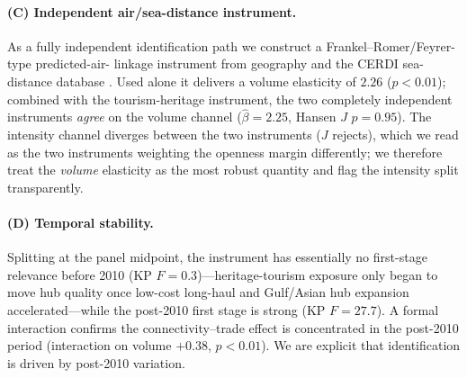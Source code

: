 \documentclass[review,3p,times]{elsarticle}
\begin{document}
\paragraph{(C) Independent air/sea-distance instrument.} As a fully independent
identification path we construct a Frankel--Romer/Feyrer-type predicted-air-
linkage instrument from geography and the CERDI sea-distance database
\citep{Frankel_1999,Feyrer_2019,Bertoli_2016}. Used alone it delivers a volume
elasticity of $2.26$ ($p<0.01$); combined with the tourism-heritage instrument,
the two completely independent instruments \emph{agree} on the volume channel
($\hat\beta=2.25$, Hansen $J$ $p=0.95$). The intensity channel diverges between
the two instruments ($J$ rejects), which we read as the two instruments
weighting the openness margin differently; we therefore treat the
\emph{volume} elasticity as the most robust quantity and flag the intensity
split transparently.

\paragraph{(D) Temporal stability.} Splitting at the panel midpoint, the
instrument has essentially no first-stage relevance before 2010 (KP
$F=0.3$)---heritage-tourism exposure only began to move hub quality once
low-cost long-haul and Gulf/Asian hub expansion accelerated---while the
post-2010 first stage is strong (KP $F=27.7$). A formal interaction confirms
the connectivity--trade effect is concentrated in the post-2010 period
(interaction on volume $+0.38$, $p<0.01$). We are explicit that identification
is driven by post-2010 variation.
\end{document}
